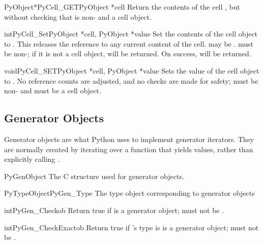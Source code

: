 \begin{cfuncdesc}{PyObject*}{PyCell_GET}{PyObject *cell}
  Return the contents of the cell , but without checking
  that  is non-\NULL{} and a cell object.
\end{cfuncdesc}

\begin{cfuncdesc}{int}{PyCell_Set}{PyObject *cell, PyObject *value}
  Set the contents of the cell object  to .  This
  releases the reference to any current content of the cell.
   may be \NULL{}.   must be non-\NULL{}; if it is
  not a cell object,  will be returned.  On success, 
  will be returned.
\end{cfuncdesc}

\begin{cfuncdesc}{void}{PyCell_SET}{PyObject *cell, PyObject *value}
  Sets the value of the cell object  to .  No
  reference counts are adjusted, and no checks are made for safety;
   must be non-\NULL{} and must be a cell object.
\end{cfuncdesc}


\subsection{Generator Objects \label{gen-objects}}

Generator objects are what Python uses to implement generator iterators.
They are normally created by iterating over a function that yields values,
rather than explicitly calling .

\begin{ctypedesc}{PyGenObject}
  The C structure used for generator objects.
\end{ctypedesc}

\begin{cvardesc}{PyTypeObject}{PyGen_Type}
  The type object corresponding to generator objects
\end{cvardesc}

\begin{cfuncdesc}{int}{PyGen_Check}{ob}
  Return true if  is a generator object;  must not be
  \NULL{}.
\end{cfuncdesc}

\begin{cfuncdesc}{int}{PyGen_CheckExact}{ob}
  Return true if 's type is 
  is a generator object;  must not be
  \NULL{}.
\end{cfuncdesc}

